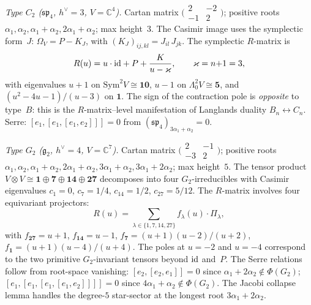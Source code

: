 \begin{theorem}
\emph{Type $C_2$ \textup{(}$\mathfrak{sp}_4$, $h^\vee=3$,
$V=\mathbb{C}^4$\textup{)}.}
Cartan matrix
$\bigl(\begin{smallmatrix} 2&-2\\-1&2
\end{smallmatrix}\bigr)$;
positive roots $\alpha_1, \alpha_2,
\alpha_1{+}\alpha_2, 2\alpha_1{+}\alpha_2$; max height~$3$.
The Casimir image uses the symplectic form~$J$:
$\Omega_V = P - K_J$, with
$(K_J)_{ij,kl} = J_{il}\,J_{jk}$.
The symplectic $R$-matrix is
\begin{equation}\label{eq:C2-R-matrix}
R(u) = u\cdot\mathrm{id} + P + \frac{K}{u-\varkappa},
\qquad \varkappa = n{+}1 = 3,
\end{equation}
with eigenvalues $u{+}1$ on $\mathrm{Sym}^2V\cong\mathbf{10}$,
$u{-}1$ on $\Lambda^2_0V\cong\mathbf{5}$, and
$(u^2{-}4u{-}1)/(u{-}3)$ on $\mathbf{1}$.
The sign of the contraction pole is \emph{opposite}
to type~$B$: this is the $R$-matrix--level manifestation
of Langlands duality $B_n \leftrightarrow C_n$.
Serre: $[e_1,[e_1,[e_1,e_2]]]=0$ from
$(\mathfrak{sp}_4)_{3\alpha_1+\alpha_2}=0$.

\emph{Type $G_2$ \textup{(}$\mathfrak{g}_2$, $h^\vee=4$,
$V=\mathbb{C}^7$\textup{)}.}
Cartan matrix
$\bigl(\begin{smallmatrix} 2&-1\\-3&2
\end{smallmatrix}\bigr)$;
positive roots $\alpha_1, \alpha_2, \alpha_1{+}\alpha_2,
2\alpha_1{+}\alpha_2, 3\alpha_1{+}\alpha_2,
3\alpha_1{+}2\alpha_2$; max height~$5$.
The tensor product
$V\otimes V \cong \mathbf{1} \oplus \mathbf{7} \oplus
\mathbf{14} \oplus \mathbf{27}$ decomposes into four
$G_2$-irreducibles with Casimir eigenvalues
$c_1=0$, $c_7=1/4$, $c_{14}=1/2$, $c_{27}=5/12$.
The $R$-matrix involves four equivariant projectors:
\begin{equation}\label{eq:G2-R-matrix}
R(u) = \sum_{\lambda\in\{1,7,14,27\}}
f_\lambda(u)\cdot\Pi_\lambda,
\end{equation}
with $f_{\mathbf{27}}=u{+}1$, $f_{\mathbf{14}}=u{-}1$,
$f_{\mathbf{7}}=(u{+}1)(u{-}2)/(u{+}2)$,
$f_{\mathbf{1}}=(u{+}1)(u{-}4)/(u{+}4)$.
The poles at $u=-2$ and $u=-4$ correspond to the two primitive
$G_2$-invariant tensors beyond $\mathrm{id}$ and~$P$.
The Serre relations follow from root-space vanishing:
$[e_2,[e_2,e_1]]=0$ since $\alpha_1{+}2\alpha_2 \notin
\Phi(G_2)$;
$[e_1,[e_1,[e_1,[e_1,e_2]]]]=0$ since
$4\alpha_1{+}\alpha_2 \notin \Phi(G_2)$.
The Jacobi collapse lemma handles the degree-$5$
star-sector at the longest root $3\alpha_1{+}2\alpha_2$.
\end{theorem}

